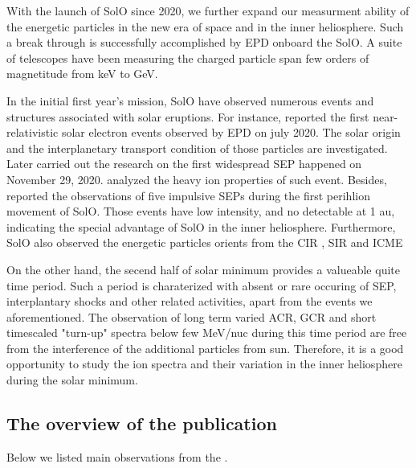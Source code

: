 
With the launch of \ac{SolO} since 2020, we further expand our measurment ability of the energetic particles in the new era of space and in the inner heliosphere. Such a break through is successfully accomplished by \ac{EPD} onboard the \ac{SolO}. A suite of telescopes have been measuring the charged particle span few orders of magnetitude from keV to GeV.

In the initial first year's mission, \ac{SolO} have observed numerous events and structures associated with solar eruptions. For instance, \citet{GomezHerrero-2021-SolO} reported the first near-relativistic solar electron events observed by \ac{EPD} on july 2020. The solar origin and the interplanetary transport condition of those particles are investigated. Later \citet{Kolhoff2021AA} carried out the research on the first widespread \ac{SEP} happened on November 29, 2020. \citet{Mason2021AA} analyzed the heavy ion properties of such event. Besides, \citet{Mason2021AA_he3rich} reported the observations of five impulsive \acp{SEP} during the first perihlion movement of \ac{SolO}. Those events have low intensity, and no detectable at 1 au, indicating the special advantage of \ac{SolO} in the inner heliosphere. Furthermore, \ac{SolO} also observed the energetic particles orients from the \ac{CIR} \citep{Allen2021AA_suprathermal}, \ac{SIR} \cite{Aran2021AA} and \ac{ICME} \citep{Kilpua2021AA}


On the other hand, the secend half of solar minimum provides a valueable quite time period. Such a period is charaterized with absent or rare occuring of \ac{SEP}, interplantary shocks and other related activities, apart from the events we aforementioned. The observation of long term varied \ac{ACR}, \ac{GCR} and short timescaled "turn-up" spectra below few MeV/nuc during this time period are free from the interference of the additional particles from sun. Therefore, it is a good opportunity to study the ion spectra and their variation in the inner heliosphere during the solar minimum.\\

\subsection*{The overview of the publication}

Below we listed main observations from the \citep{Mason-2021-SolOQuietTime}.

